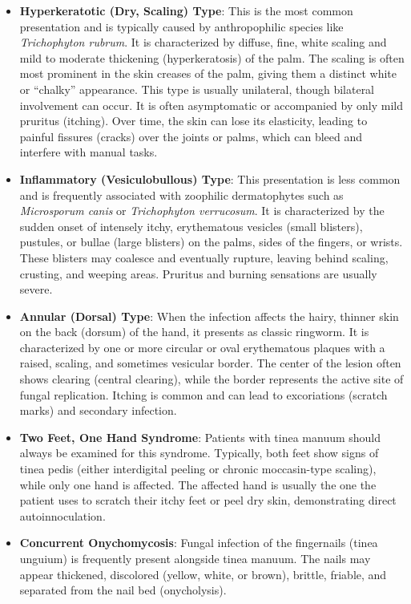\begin{itemize}
    \item \textbf{Hyperkeratotic (Dry, Scaling) Type}: This is the most common presentation and is typically caused by anthropophilic species like \textit{Trichophyton rubrum}. It is characterized by diffuse, fine, white scaling and mild to moderate thickening (hyperkeratosis) of the palm. The scaling is often most prominent in the skin creases of the palm, giving them a distinct white or ``chalky'' appearance. This type is usually unilateral, though bilateral involvement can occur. It is often asymptomatic or accompanied by only mild pruritus (itching). Over time, the skin can lose its elasticity, leading to painful fissures (cracks) over the joints or palms, which can bleed and interfere with manual tasks.
    \item \textbf{Inflammatory (Vesiculobullous) Type}: This presentation is less common and is frequently associated with zoophilic dermatophytes such as \textit{Microsporum canis} or \textit{Trichophyton verrucosum}. It is characterized by the sudden onset of intensely itchy, erythematous vesicles (small blisters), pustules, or bullae (large blisters) on the palms, sides of the fingers, or wrists. These blisters may coalesce and eventually rupture, leaving behind scaling, crusting, and weeping areas. Pruritus and burning sensations are usually severe.
    \item \textbf{Annular (Dorsal) Type}: When the infection affects the hairy, thinner skin on the back (dorsum) of the hand, it presents as classic ringworm. It is characterized by one or more circular or oval erythematous plaques with a raised, scaling, and sometimes vesicular border. The center of the lesion often shows clearing (central clearing), while the border represents the active site of fungal replication. Itching is common and can lead to excoriations (scratch marks) and secondary infection.
    \item \textbf{Two Feet, One Hand Syndrome}: Patients with tinea manuum should always be examined for this syndrome. Typically, both feet show signs of tinea pedis (either interdigital peeling or chronic moccasin-type scaling), while only one hand is affected. The affected hand is usually the one the patient uses to scratch their itchy feet or peel dry skin, demonstrating direct autoinnoculation.
    \item \textbf{Concurrent Onychomycosis}: Fungal infection of the fingernails (tinea unguium) is frequently present alongside tinea manuum. The nails may appear thickened, discolored (yellow, white, or brown), brittle, friable, and separated from the nail bed (onycholysis).
\end{itemize}

